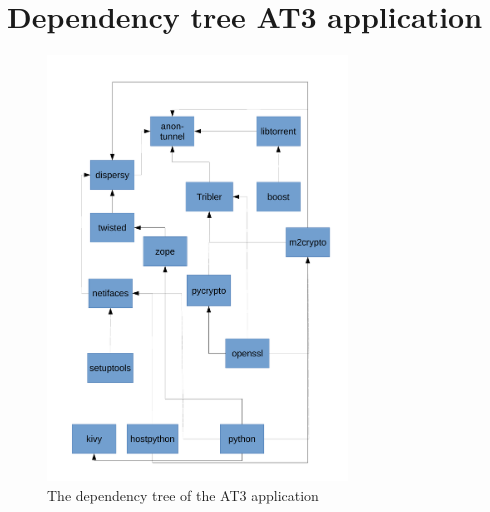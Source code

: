 \chapter{Dependency tree AT3 application}
\label{chp:dependency-tree}

\begin{figure}[!h]
    \centering
    \includegraphics[width=0.71\textwidth]{appendices/dependency-tree.pdf}
    \caption{The dependency tree of the AT3 application}
\end{figure}